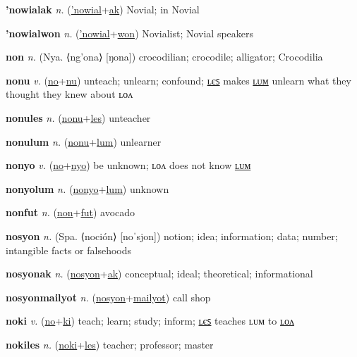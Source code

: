\textbf{\hypertarget{'nowialak}{'nowialak}} \textit{n.} (\hyperlink{'nowial}{'nowial}+\allowbreak \hyperlink{ak}{ak})
Novial; in Novial

\textbf{\hypertarget{'nowialwon}{'nowialwon}} \textit{n.} (\hyperlink{'nowial}{'nowial}+\allowbreak \hyperlink{won}{won})
Novialist; Novial speakers

\textbf{\hypertarget{non}{non}} \textit{n.} (Nya. ⟨ng’ona⟩ [ŋona])
crocodilian; crocodile; alligator; Crocodilia

\textbf{\hypertarget{nonu}{nonu}} \textit{v.} (\hyperlink{no}{no}+\allowbreak \hyperlink{nu}{nu})
unteach; unlearn; confound; \hyperlink{nonules}{ʟєꜱ} makes \hyperlink{nonulum}{ʟᴜᴍ} unlearn what they thought they knew about ʟᴏᴧ

\textbf{\hypertarget{nonules}{nonules}} \textit{n.} (\hyperlink{nonu}{nonu}+\allowbreak \hyperlink{les}{les})
unteacher

\textbf{\hypertarget{nonulum}{nonulum}} \textit{n.} (\hyperlink{nonu}{nonu}+\allowbreak \hyperlink{lum}{lum})
unlearner

\textbf{\hypertarget{nonyo}{nonyo}} \textit{v.} (\hyperlink{no}{no}+\allowbreak \hyperlink{nyo}{nyo})
be unknown; ʟᴏᴧ does not know \hyperlink{nonyolum}{ʟᴜᴍ}

\textbf{\hypertarget{nonyolum}{nonyolum}} \textit{n.} (\hyperlink{nonyo}{nonyo}+\allowbreak \hyperlink{lum}{lum})
unknown

\textbf{\hypertarget{nonfut}{nonfut}} \textit{n.} (\hyperlink{non}{non}+\allowbreak \hyperlink{fut}{fut})
avocado

\textbf{\hypertarget{nosyon}{nosyon}} \textit{n.} (Spa. ⟨noción⟩ [noˈsjon])
notion; idea; information; data; number; intangible facts or falsehoods

\textbf{\hypertarget{nosyonak}{nosyonak}} \textit{n.} (\hyperlink{nosyon}{nosyon}+\allowbreak \hyperlink{ak}{ak})
conceptual; ideal; theoretical; informational

\textbf{\hypertarget{nosyonmailyot}{nosyonmailyot}} \textit{n.} (\hyperlink{nosyon}{nosyon}+\allowbreak \hyperlink{mailyot}{mailyot})
call shop

\textbf{\hypertarget{noki}{noki}} \textit{v.} (\hyperlink{no}{no}+\allowbreak \hyperlink{ki}{ki})
teach; learn; study; inform; \hyperlink{nokiles}{ʟєꜱ} teaches ʟᴜᴍ to \hyperlink{nokilon}{ʟᴏᴧ}

\textbf{\hypertarget{nokiles}{nokiles}} \textit{n.} (\hyperlink{noki}{noki}+\allowbreak \hyperlink{les}{les})
teacher; professor; master

